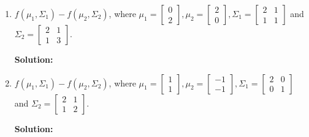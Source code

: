 \documentclass{article}
\newcommand{\solution}{\textbf{Solution: }}
\begin{document}
\begin{enumerate}[label=(\alph*)]
    \item $f(\mu_1, \Sigma_1) - f(\mu_2, \Sigma_2)$, where $\mu_1 = \begin{bmatrix} 0 \\ 2 \end{bmatrix}, \mu_2 = \begin{bmatrix} 2 \\ 0 \end{bmatrix}, \Sigma_1 = \begin{bmatrix} 2 & 1 \\ 1 & 1 \end{bmatrix}$ and $\Sigma_2 = \begin{bmatrix} 2 & 1 \\ 1 & 3 \end{bmatrix}$.
    \begin{mdframed} \solution
    \end{mdframed}

    \item $f(\mu_1, \Sigma_1) - f(\mu_2, \Sigma_2)$, where $\mu_1 = \begin{bmatrix} 1 \\ 1 \end{bmatrix}, \mu_2 = \begin{bmatrix} -1 \\ -1 \end{bmatrix}, \Sigma_1 = \begin{bmatrix} 2 & 0 \\ 0 & 1 \end{bmatrix}$ and $\Sigma_2 = \begin{bmatrix} 2 & 1 \\ 1 & 2 \end{bmatrix}$.
    \begin{mdframed} \solution
    \end{mdframed}

\end{enumerate}

\newpage
\end{document}
